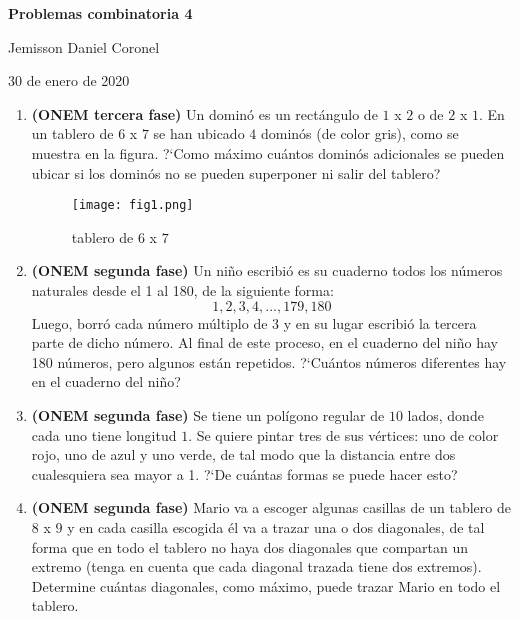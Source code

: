 \documentclass[10pt,a4 paper]{article}
\begin{document}
\chead{}

\begin{center}
\textbf{\Large{Problemas combinatoria 4}}
\end{center}

\begin{center}
Jemisson Daniel Coronel
\end{center}

\begin{center}
30 de enero de 2020
\end{center}
\vspace{9mm}
\begin{enumerate}


\item \textbf{(ONEM tercera fase)} Un domin\'o es un rect\'angulo de $1$ x $2$ o de $2$ x $1$. En un tablero de $6$ x $7$ se han ubicado $4$ domin\'os (de color gris), como se muestra en la figura. ?`Como m\'aximo cu\'antos domin\'os adicionales se pueden ubicar si los domin\'os no se pueden superponer ni salir del tablero?

\begin{figure}[!ht]
\begin{center}
  \texttt{[image: fig1.png]}
  \caption{tablero de $6$ x $7$}
\end{center}
\end{figure}

\item \textbf{(ONEM segunda fase)} Un ni\~no escribi\'o es su cuaderno todos los n\'umeros naturales desde el 1 al 180, de la siguiente forma:
$$1, 2, 3, 4, ..., 179, 180$$
Luego, borr\'o cada n\'umero m\'ultiplo de 3 y en su lugar escribi\'o la tercera parte de dicho n\'umero. Al final de este proceso, en el cuaderno del ni\~no hay 180 n\'umeros, pero algunos est\'an repetidos. ?`Cu\'antos n\'umeros diferentes hay en el cuaderno del ni\~no?  

\item \textbf{(ONEM segunda fase)} Se tiene un pol\'igono regular de $10$ lados, donde cada uno tiene longitud $1$. Se quiere pintar tres de sus v\'ertices: uno de color rojo, uno de azul y uno verde, de tal modo que la distancia entre dos cualesquiera sea mayor a 1. ?`De cu\'antas formas se puede hacer esto?

\item \textbf{(ONEM segunda fase)} Mario va a escoger algunas casillas de un tablero de $8$ x $9$ y en cada casilla escogida \'el va a trazar una o dos diagonales, de tal forma que en todo el tablero no haya dos diagonales que compartan un extremo (tenga en cuenta que cada diagonal trazada tiene dos extremos). Determine cu\'antas diagonales, como m\'aximo, puede trazar Mario en todo el tablero.


\end{enumerate}
\end{document}
